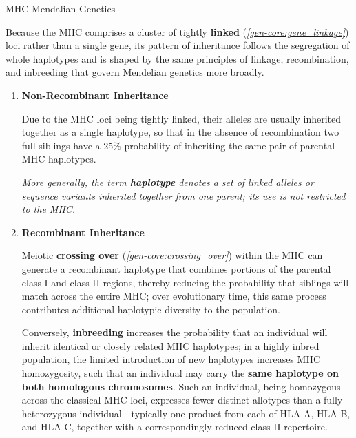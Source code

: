     \begin{core}{MHC Mendalian Genetics}

      Because the MHC comprises a cluster of tightly \textbf{linked} (\textit{\autoref{gen-core:gene_linkage}}) loci rather than a single gene, its pattern of inheritance follows the segregation of whole haplotypes and is shaped by the same principles of linkage, recombination, and inbreeding that govern Mendelian genetics more broadly.

      \begin{enumerate}

        \item \textbf{Non-Recombinant Inheritance} 

          Due to the MHC loci being tightly linked, their alleles are usually inherited together as a single haplotype, so that in the absence of recombination two full siblings have a 25\% probability of inheriting the same pair of parental MHC haplotypes.


          \textit{More generally, the term \textbf{haplotype} denotes a set of linked alleles or sequence variants inherited together from one parent; its use is not restricted to the MHC.}

        \item \textbf{Recombinant Inheritance}

          Meiotic \textbf{crossing over} (\textit{\autoref{gen-core:crossing_over}}) within the MHC can generate a recombinant haplotype that combines portions of the parental class I and class II regions, thereby reducing the probability that siblings will match across the entire MHC; over evolutionary time, this same process contributes additional haplotypic diversity to the population.

          Conversely, \textbf{inbreeding} increases the probability that an individual will inherit identical or closely related MHC haplotypes; in a highly inbred population, the limited introduction of new haplotypes increases MHC homozygosity, such that an individual may carry the \textbf{same haplotype on both homologous chromosomes}. Such an individual, being homozygous across the classical MHC loci, expresses fewer distinct allotypes than a fully heterozygous individual---typically one product from each of HLA-A, HLA-B, and HLA-C, together with a correspondingly reduced class II repertoire.


      \end{enumerate}

    \end{core}

